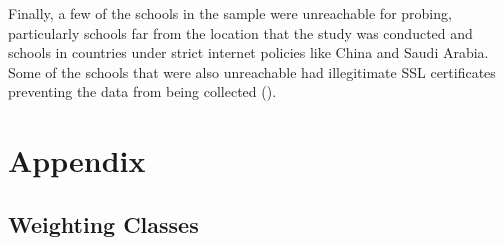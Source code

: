 \documentclass{article}
\theoremstyle{definition}
\begin{document}
\begin{flushleft}
\begin{multicols}{2}
Finally, a few of the schools in the sample were unreachable for probing,
particularly schools far from the location that the study was conducted
and schools in countries under strict internet policies like China and
Saudi Arabia. Some of the schools that were also unreachable had
illegitimate SSL certificates preventing the data from being collected
(\cite{curlSSL}).



\end{multicols}
\end{flushleft}
\printbibliography
\section{Appendix}
\subsection{Weighting Classes} \label{sec:weights}
\end{document}
